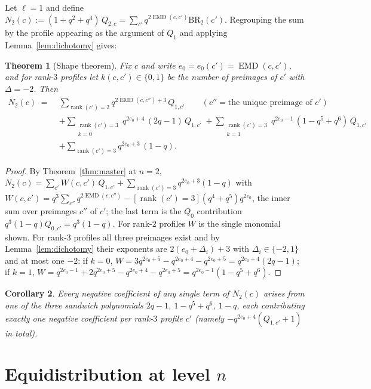 \documentclass[11pt]{article}
\newtheorem{theorem}{Theorem}
\newtheorem{corollary}[theorem]{Corollary}
\newcommand{\EMD}{\operatorname{EMD}}
\newcommand{\rk}{\operatorname{rank}}
\begin{document}
Let $\ell=1$ and define $N_2(c):=(1+q^2+q^4)\,Q_{2,c}
=\sum_{c'}q^{2\EMD(c,c')}\mathrm{BR}_2(c')$.
Regrouping the sum by the profile appearing as the argument of $Q_1$ and
applying Lemma~\ref{lem:dichotomy} gives:

\begin{theorem}[Shape theorem]\label{thm:shape}
Fix $c$ and write $e_0=e_0(c')=\EMD(c,c')$, and for rank-$3$ profiles let
$k(c,c')\in\{0,1\}$ be the number of preimages of $c'$ with $\Delta=-2$. Then
\begin{align*}
N_2(c)\;=\;&\sum_{\rk(c')=2} q^{2\EMD(c,c'')+3}\,Q_{1,c'}
\qquad (c''=\text{the unique preimage of }c')\\
&+\sum_{\substack{\rk(c')=3\\ k=0}} q^{2e_0+4}\,(2q-1)\,Q_{1,c'}
\;+\sum_{\substack{\rk(c')=3\\ k=1}} q^{2e_0-1}\,(1-q^5+q^6)\,Q_{1,c'}\\
&+\sum_{\rk(c')=3} q^{2e_0+3}\,(1-q).
\end{align*}
\end{theorem}

\begin{proof}
By Theorem~\ref{thm:master} at $n=2$,
$N_2(c)=\sum_{c'}W(c,c')\,Q_{1,c'}+\sum_{\rk(c')=3}q^{2e_0+3}(1-q)$ with
$W(c,c')=q^3\sum_{c''}q^{2\EMD(c,c'')}-[\rk(c')=3](q^4+q^5)q^{2e_0}$, the
inner sum over preimages $c''$ of $c'$; the last term is the $Q_0$
contribution $q^3(1-q)Q_{0,c'}=q^3(1-q)$. For rank-$2$ profiles $W$ is the
single monomial shown. For rank-$3$ profiles all three preimages exist and by
Lemma~\ref{lem:dichotomy} their exponents are $2(e_0+\Delta_i)+3$ with
$\Delta_i\in\{-2,1\}$ and at most one $-2$:
if $k=0$, $W=3q^{2e_0+5}-q^{2e_0+4}-q^{2e_0+5}=q^{2e_0+4}(2q-1)$;
if $k=1$, $W=q^{2e_0-1}+2q^{2e_0+5}-q^{2e_0+4}-q^{2e_0+5}
=q^{2e_0-1}(1-q^5+q^6)$.
\end{proof}

\begin{corollary}
Every negative coefficient of any single term of $N_2(c)$ arises from one of
the three sandwich polynomials $2q-1$, $1-q^5+q^6$, $1-q$, each contributing
exactly one negative coefficient per rank-$3$ profile $c'$
(namely $-q^{2e_0+4}(Q_{1,c'}+1)$ in total).
\end{corollary}

\section{Equidistribution at level $n$}
\end{document}
